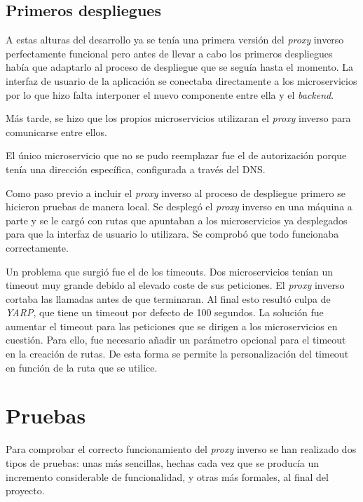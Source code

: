 \documentclass[11pt,spanish,listoffigures]{tfgetsinf}
\begin{document}
\subsection{Primeros despliegues}

A estas alturas del desarrollo ya se tenía una primera versión del \emph{proxy} inverso perfectamente funcional pero antes de llevar a cabo los primeros despliegues había que adaptarlo al proceso de despliegue que se seguía hasta el momento. La interfaz de usuario de la aplicación se conectaba directamente a los microservicios por lo que hizo falta interponer el nuevo componente entre ella y el \emph{backend}.

Más tarde, se hizo que los propios microservicios utilizaran el \emph{proxy} inverso para comunicarse entre ellos.

El único microservicio que no se pudo reemplazar fue el de autorización porque tenía una dirección específica, configurada a través del DNS.

Como paso previo a incluir el \emph{proxy} inverso al proceso de despliegue primero se hicieron pruebas de manera local. Se desplegó el \emph{proxy} inverso en una máquina a parte y se le cargó con rutas que apuntaban a los microservicios ya desplegados para que la interfaz de usuario lo utilizara. Se comprobó que todo funcionaba correctamente.

Un problema que surgió fue el de los timeouts. Dos microservicios tenían un timeout muy grande debido al elevado coste de sus peticiones. El \emph{proxy} inverso cortaba las llamadas antes de que terminaran. Al final esto resultó culpa de \emph{YARP}, que tiene un timeout por defecto de 100 segundos. La solución fue aumentar el timeout para las peticiones que se dirigen a los microservicios en cuestión. Para ello, fue necesario añadir un parámetro opcional para el timeout en la creación de rutas. De esta forma se permite la personalización del timeout en función de la ruta que se utilice.


\section{Pruebas}

Para comprobar el correcto funcionamiento del \emph{proxy} inverso se han realizado dos tipos de pruebas: unas más sencillas, hechas cada vez que se producía un incremento considerable de funcionalidad, y otras más formales, al final del proyecto.
\end{document}
